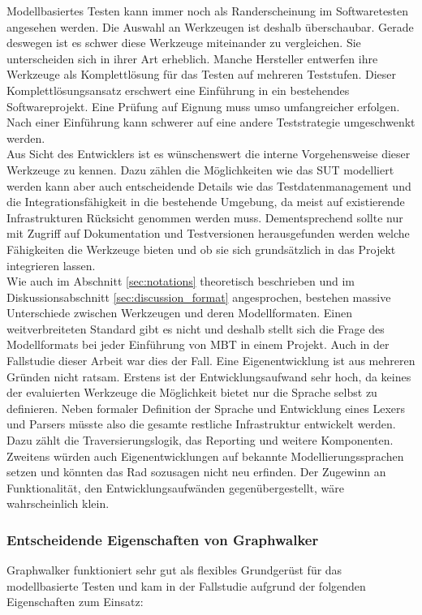 Modellbasiertes Testen kann immer noch als Randerscheinung im Softwaretesten angesehen werden. Die Auswahl an Werkzeugen ist deshalb überschaubar. Gerade deswegen ist es schwer diese Werkzeuge miteinander zu vergleichen. Sie unterscheiden sich in ihrer Art erheblich. Manche Hersteller entwerfen ihre Werkzeuge als Komplettlösung für das Testen auf mehreren Teststufen. Dieser Komplettlösungsansatz erschwert eine Einführung in ein bestehendes Softwareprojekt. Eine Prüfung auf Eignung muss umso umfangreicher erfolgen. Nach einer Einführung kann schwerer auf eine andere Teststrategie umgeschwenkt werden.\\
Aus Sicht des Entwicklers ist es wünschenswert die interne Vorgehensweise dieser Werkzeuge zu kennen. Dazu zählen die Möglichkeiten wie das \Gls{SUT} modelliert werden kann aber auch entscheidende Details wie das Testdatenmanagement und die Integrationsfähigkeit in die bestehende Umgebung, da meist auf existierende Infrastrukturen Rücksicht genommen werden muss. Dementsprechend sollte nur mit Zugriff auf Dokumentation und Testversionen herausgefunden werden welche Fähigkeiten die Werkzeuge bieten und ob sie sich grundsätzlich in das Projekt integrieren lassen.\\
Wie auch im Abschnitt \ref{sec:notations} theoretisch beschrieben und im Diskussionsabschnitt \ref{sec:discussion_format} angesprochen, bestehen massive Unterschiede zwischen Werkzeugen und deren Modellformaten. Einen weitverbreiteten Standard gibt es nicht und deshalb stellt sich die Frage des Modellformats bei jeder Einführung von \Gls{MBT} in einem Projekt. Auch in der Fallstudie dieser Arbeit war dies der Fall. Eine Eigenentwicklung ist aus mehreren Gründen nicht ratsam. Erstens ist der Entwicklungsaufwand sehr hoch, da keines der evaluierten Werkzeuge die Möglichkeit bietet nur die Sprache selbst zu definieren. Neben formaler Definition der Sprache und Entwicklung eines Lexers und Parsers müsste also die gesamte restliche Infrastruktur entwickelt werden. Dazu zählt die Traversierungslogik, das Reporting und weitere Komponenten. Zweitens würden auch Eigenentwicklungen auf bekannte Modellierungssprachen setzen und könnten das Rad sozusagen nicht neu erfinden. Der Zugewinn an Funktionalität, den Entwicklungsaufwänden gegenübergestellt, wäre wahrscheinlich klein.\\


\subsubsection{Entscheidende Eigenschaften von Graphwalker}
Graphwalker funktioniert sehr gut als flexibles Grundgerüst für das modellbasierte Testen und kam in der Fallstudie aufgrund der folgenden Eigenschaften zum Einsatz:

